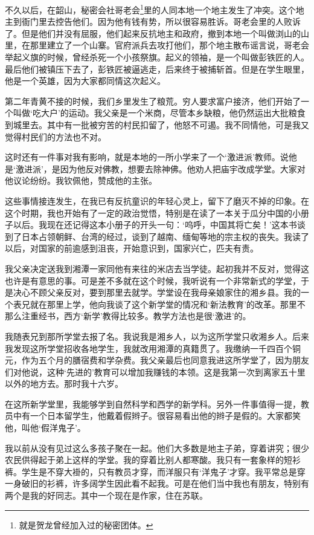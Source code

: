 \documentclass[10pt]{book}
\begin{document}
不久以后，在韶山，秘密会社哥老会\footnote{就是贺龙曾经加入过的秘密团体。}里的人同本地一个地主发生了冲突。这个地主到衙门里去控告他们。因为他有钱有势，所以很容易胜诉。哥老会里的人败诉了。但是他们并没有屈服，他们起来反抗地主和政府，撤到本地一个叫做浏山的山里，在那里建立了一个山寨。官府派兵去攻打他们，那个地主散布谣言说，哥老会举起义旗的时候，曾经杀死一个小孩祭旗。起义的领袖，是一个叫做彭铁匠的人。最后他们被镇压下去了，彭铁匠被逼逃走，后来终于被捕斩首。但是在学生眼里，他是一个英雄，因为大家都同情这次起义。

第二年青黄不接的时候，我们乡里发生了粮荒。穷人要求富户接济，他们开始了一个叫做‘吃大户’的运动。我父亲是一个米商，尽管本乡缺粮，他仍然运出大批粮食到城里去。其中有一批被穷苦的村民扣留了，他怒不可遏。我不同情他，可是我又觉得村民们的方法也不对。

这时还有一件事对我有影响，就是本地的一所小学来了一个‘激进派’教师。说他是‘激进派’，是因为他反对佛教，想要去除神佛。他劝人把庙宇改成学堂。大家对他议论纷纷。我钦佩他，赞成他的主张。

这些事情接连发生，在我已有反抗童识的年轻心灵上，留下了磨灭不掉的印象。在这个时期，我也开始有了一定的政治觉悟，特别是在读了一本关于瓜分中国的小册子以后。我现在还记得这本小册子的开头一句：‘呜呼，中国其将亡矣！’这本书谈到了日本占领朝鲜、台湾的经过，谈到了越南、缅甸等地的宗主权的丧失。我读了以后，对国家的前逾感到沮丧，开始意识到，国家兴亡，匹夫有责。

我父亲决定送我到湘潭一家同他有来往的米店去当学徒。起初我并不反对，觉得这也许是有意思的事。可是差不多就在这个时候，我听说有一个非常新式的学堂，于是决心不顾父亲反对，要到那里去就学。学堂设在我母亲娘家住的湘乡县。我的一个表兄就在那里上学，他向我谈了这个新学堂的情况和‘新法教育’的改革。那里不那么注重经书，西方‘新学’教得比较多。教学方法也是很‘激进’的。

我随表兄到那所学堂去报了名。我说我是湘乡人，以为这所学堂只收湘乡人。后来我发现这所学堂招收各地学生，我就改用湘潭的真籍贯了。我缴纳一千四百个铜元，作为五个月的膳宿费和学杂费。我父亲最后也同意我进这所学堂了，因为朋友们对他说，这种‘先进的’教育可以增加我赚钱的本领。这是我第一次到离家五十里以外的地方去。那时我十六岁。

在这所新学堂里，我能够学到自然科学和西学的新学科。另外一件事值得一提，教员中有一个日本留学生，他戴着假辫子。很容易看出他的辫子是假的。大家都笑他，叫他‘假洋鬼子’。

我以前从没有见过这么多孩子聚在一起。他们大多数是地主子弟，穿着讲究；很少农民供得起于弟上这样的学堂。我的穿着比别人都寒酸。我只有一套象样的短衫裤。学生是不穿大褂的，只有教员才穿，而洋服只有‘洋鬼子’才穿。我平常总是穿一身破旧的衫裤，许多阔学生因此看不起我。可是在他们当中我也有朋友，特别有两个是我的好同志。其中一个现在是作家，住在苏联。
\end{document}
